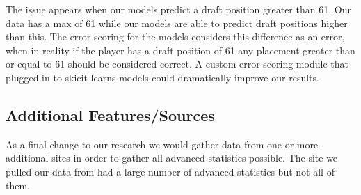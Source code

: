 \documentclass{article}
\begin{document}
The issue appears when our models predict a draft position greater than 61. Our
data has a max of 61 while our models are able to predict draft positions higher
than this. The error scoring for the models considers this difference as an
error, when in reality if the player has a draft position of 61 any placement
greater than or equal to 61 should be considered correct. A custom error scoring
module that plugged in to skicit learns models could dramatically improve our
results.

\subsection{Additional Features/Sources}

As a final change to our research we would gather data from one or more
additional sites in order to gather all advanced statistics possible. The site
we pulled our data from had a large number of advanced statistics but not all of
them.
\end{document}
